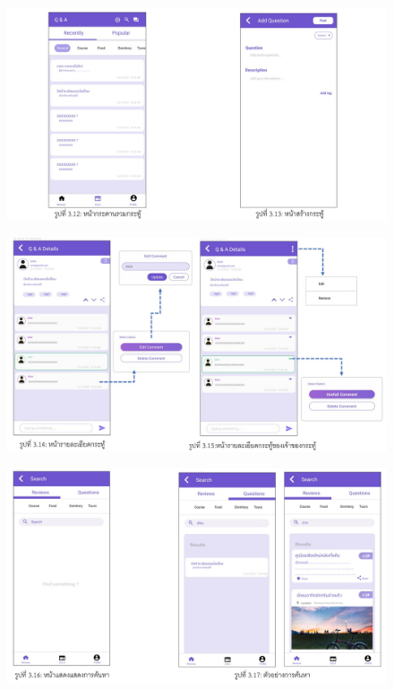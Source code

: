  \begin{figure}
  \begin{center}
    \includegraphics[width=1\textwidth]{./image/reviews/Slide6.JPG}
  \end{center}
  \end{figure}

 \begin{figure}
  \begin{center}
    \includegraphics[width=1\textwidth]{./image/reviews/Slide7.JPG}
  \end{center}
  \end{figure}

 \begin{figure}
  \begin{center}
    \includegraphics[width=1\textwidth]{./image/reviews/Slide8.JPG}
  \end{center}
  \end{figure}

